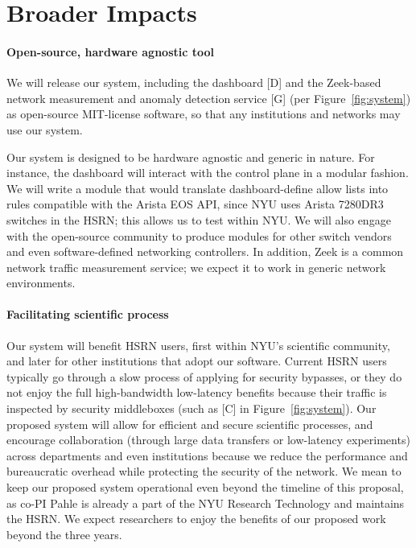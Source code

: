 \section{Broader Impacts}\label{sec:impacts}

\paragraph{Open-source, hardware agnostic tool}
We will release our system, including the dashboard [D] and the Zeek-based network measurement and anomaly detection service [G] (per Figure~\ref{fig:system}) as open-source MIT-license software, so that any institutions and networks may use our system.

Our system is designed to be hardware agnostic and generic in nature. For instance, the dashboard will interact with the control plane in a modular fashion. We will write a module that would translate dashboard-define allow lists into rules compatible with the Arista EOS API, since NYU uses Arista 7280DR3 switches in the HSRN; this allows us to test within NYU. We will also engage with the open-source community to produce modules for other switch vendors and even software-defined networking controllers. In addition, Zeek is a common network traffic measurement service; we expect it to work in generic network environments.

\paragraph{Facilitating scientific process}
Our system will benefit HSRN users, first within NYU's scientific community, and later for other institutions that adopt our software. Current HSRN users typically go through a slow process of applying for security bypasses, or they do not enjoy the full high-bandwidth low-latency benefits because their traffic is inspected by security middleboxes (such as [C] in Figure~\ref{fig:system}). Our proposed system will allow for efficient and secure scientific processes, and encourage collaboration (through large data transfers or low-latency experiments) across departments and even institutions because we reduce the performance and bureaucratic overhead while protecting the security of the network. We mean to keep our proposed system operational even beyond the timeline of this proposal, as co-PI Pahle is already a part of the NYU Research Technology and maintains the HSRN. We expect researchers to enjoy the benefits of our proposed work beyond the three years.

